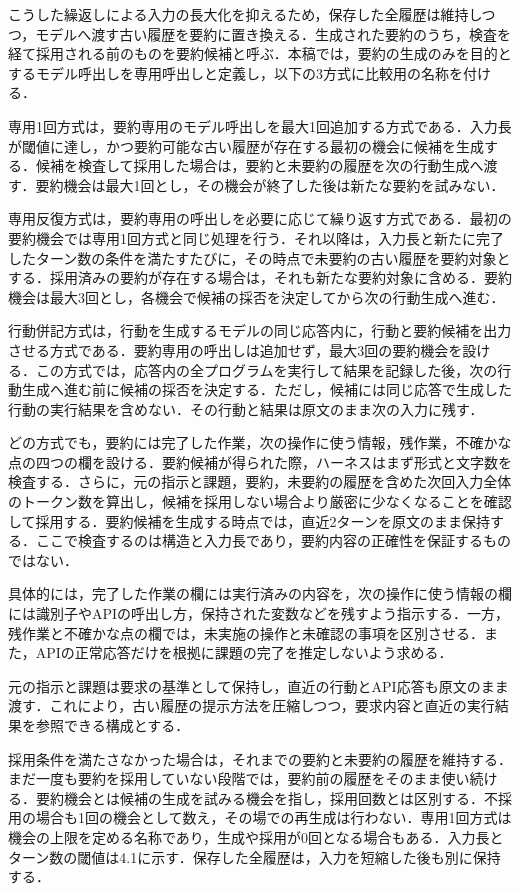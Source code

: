 \documentclass[letter]{ieicej}
\begin{document}
こうした繰返しによる入力の長大化を抑えるため，保存した全履歴は維持しつつ，モデルへ渡す古い履歴を要約に置き換える．生成された要約のうち，検査を経て採用される前のものを要約候補と呼ぶ．本稿では，要約の生成のみを目的とするモデル呼出しを専用呼出しと定義し，以下の3方式に比較用の名称を付ける．

専用1回方式は，要約専用のモデル呼出しを最大1回追加する方式である．入力長が閾値に達し，かつ要約可能な古い履歴が存在する最初の機会に候補を生成する．候補を検査して採用した場合は，要約と未要約の履歴を次の行動生成へ渡す．要約機会は最大1回とし，その機会が終了した後は新たな要約を試みない．

専用反復方式は，要約専用の呼出しを必要に応じて繰り返す方式である．最初の要約機会では専用1回方式と同じ処理を行う．それ以降は，入力長と新たに完了したターン数の条件を満たすたびに，その時点で未要約の古い履歴を要約対象とする．採用済みの要約が存在する場合は，それも新たな要約対象に含める．要約機会は最大3回とし，各機会で候補の採否を決定してから次の行動生成へ進む．

行動併記方式は，行動を生成するモデルの同じ応答内に，行動と要約候補を出力させる方式である．要約専用の呼出しは追加せず，最大3回の要約機会を設ける．この方式では，応答内の全プログラムを実行して結果を記録した後，次の行動生成へ進む前に候補の採否を決定する．ただし，候補には同じ応答で生成した行動の実行結果を含めない．その行動と結果は原文のまま次の入力に残す．

どの方式でも，要約には完了した作業，次の操作に使う情報，残作業，不確かな点の四つの欄を設ける．要約候補が得られた際，ハーネスはまず形式と文字数を検査する．さらに，元の指示と課題，要約，未要約の履歴を含めた次回入力全体のトークン数を算出し，候補を採用しない場合より厳密に少なくなることを確認して採用する．要約候補を生成する時点では，直近2ターンを原文のまま保持する．ここで検査するのは構造と入力長であり，要約内容の正確性を保証するものではない．

具体的には，完了した作業の欄には実行済みの内容を，次の操作に使う情報の欄には識別子やAPIの呼出し方，保持された変数などを残すよう指示する．一方，残作業と不確かな点の欄では，未実施の操作と未確認の事項を区別させる．また，APIの正常応答だけを根拠に課題の完了を推定しないよう求める．

元の指示と課題は要求の基準として保持し，直近の行動とAPI応答も原文のまま渡す．これにより，古い履歴の提示方法を圧縮しつつ，要求内容と直近の実行結果を参照できる構成とする．

採用条件を満たさなかった場合は，それまでの要約と未要約の履歴を維持する．まだ一度も要約を採用していない段階では，要約前の履歴をそのまま使い続ける．要約機会とは候補の生成を試みる機会を指し，採用回数とは区別する．不採用の場合も1回の機会として数え，その場での再生成は行わない．専用1回方式は機会の上限を定める名称であり，生成や採用が0回となる場合もある．入力長とターン数の閾値は4.1に示す．保存した全履歴は，入力を短縮した後も別に保持する．
\end{document}
